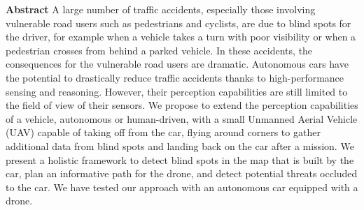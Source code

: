 
\textbf{Abstract} A large number of traffic accidents, especially those involving vulnerable road users such as pedestrians and cyclists, are due to blind spots for the driver, for example when a vehicle takes a turn with poor visibility or when a pedestrian crosses from behind a parked vehicle. In these accidents, the consequences for the vulnerable road users are dramatic. Autonomous cars have the potential to drastically reduce traffic accidents thanks to high-performance sensing and reasoning. However, their perception capabilities are still limited to the field of view of their sensors.
We propose to extend the perception capabilities of a vehicle, autonomous or human-driven, with a small Unmanned Aerial Vehicle (UAV) capable of taking off from the car, flying around corners to gather additional data from blind spots and landing back on the car after a mission. We present a holistic framework to detect blind spots in the map that is built by the car, plan an informative path for the drone, and detect potential threats occluded to the car. We have tested our approach with an autonomous car equipped with a drone.

